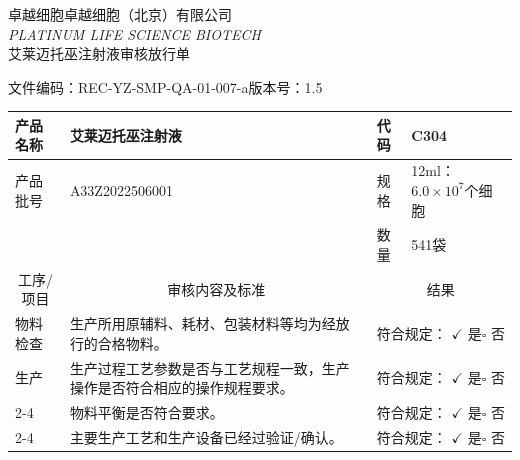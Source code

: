 \documentclass[UTF8,10pt,a4paper,fontset=fandol]{ctexart}
\renewcommand{\arraystretch}{1.15}
\newcommand{\fieldvalue}[1]{#1}
\newcommand{\handwritten}[1]{#1}
\let\mathcheckmark\checkmark
\renewcommand{\checkmark}{\ensuremath{\mathcheckmark}}
\begin{document}
\newpage

\begin{center}
卓越细胞卓越细胞（北京）有限公司\\[-2pt]
\textit{PLATINUM LIFE SCIENCE BIOTECH}\\[6pt]
艾莱迈托巫注射液审核放行单
\end{center}

\begin{flushright}
文件编码：REC-YZ-SMP-QA-01-007-a\qquad 版本号：1.5
\end{flushright}

\renewcommand{\arraystretch}{1.35}
\small
\begin{tabularx}{\textwidth}{|p{}|X|p{}|X|}
\hline
产品名称 &
\fieldvalue{艾莱迈托巫注射液}
& 代码 &
\fieldvalue{C304}
\\ \hline
产品批号 &
\fieldvalue{A33Z2022506001}
& 规格 &
\fieldvalue{12ml：$6.0\times 10^{7}$个细胞}
\\ \hline
& & 数量 &
\fieldvalue{541袋}
\\ \hline
\multicolumn{1}{|c|}{工序/项目}
& \multicolumn{1}{c|}{审核内容及标准}
& \multicolumn{2}{c|}{结果}
\\ \hline
物料检查
& 生产所用原辅料、耗材、包装材料等均为经放行的合格物料。
& \multicolumn{2}{l|}{符合规定：%
\fieldvalue{\handwritten{\checkmark}} 是\quad $\square$ 否}
\\ \hline
生产
& 生产过程工艺参数是否与工艺规程一致，生产操作是否符合相应的操作规程要求。
& \multicolumn{2}{l|}{符合规定：%
\fieldvalue{\handwritten{\checkmark}} 是\quad $\square$ 否}
\\ \cline{2-4}
&
物料平衡是否符合要求。
& \multicolumn{2}{l|}{符合规定：%
\fieldvalue{\handwritten{\checkmark}} 是\quad $\square$ 否}
\\ \cline{2-4}
&
主要生产工艺和生产设备已经过验证/确认。
& \multicolumn{2}{l|}{符合规定：%
\fieldvalue{\handwritten{\checkmark}} 是\quad $\square$ 否}

\end{tabularx}
\end{document}
